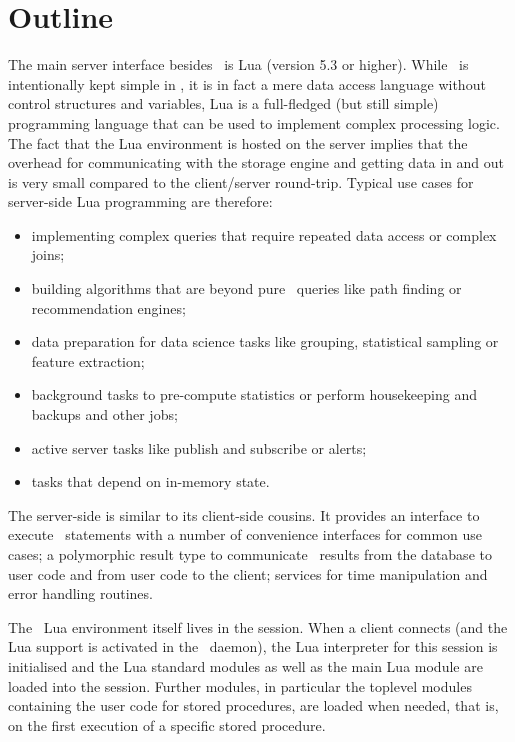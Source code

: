 \section{Outline}
The main server interface
besides \sql\ is Lua (version 5.3 or higher).
While \sql\ is intentionally kept simple in \nowdb,
it is in fact a mere data access language
without control structures and variables,
Lua is a full-fledged (but still simple)
programming language that can be used to
implement complex processing logic.
The fact that the Lua environment is hosted
on the server implies that the overhead
for communicating with the storage engine
and getting data in and out is very small
compared to the client/server round-trip.
Typical use cases for server-side Lua programming
are therefore:

\begin{itemize}
\item implementing complex queries that require
      repeated data access or complex joins;
\item building algorithms that are beyond pure \sql\ queries
      like path finding or recommendation engines; 
\item data preparation for data science tasks
      like grouping, statistical sampling or
       feature extraction; 
\item background tasks to pre-compute statistics or
      perform housekeeping and backups
      and other  jobs;
\item active server tasks like publish and subscribe or alerts;
\item tasks that depend on in-memory state.
\end{itemize}

The server-side  is similar
to its client-side cousins. It provides
an interface to execute \sql\ statements with
a number of convenience interfaces for common
use cases; a polymorphic result type
to communicate \sql\ results from the database
to user code and
from user code to the client; services for
time manipulation and error handling routines.

The \nowdb\ Lua environment itself
lives in the session.
When a client connects
(and the Lua support
is activated in the \nowdb\ daemon),
the Lua interpreter for this session is initialised
and the Lua standard modules 
as well as the main Lua module are loaded
into the session.
Further modules, in particular the toplevel modules
containing the user code for stored procedures,
are loaded when needed, that is, on the first
execution of a specific stored procedure.

